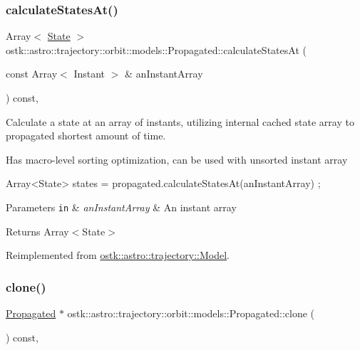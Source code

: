 \subsubsection{\texorpdfstring{calculate\+States\+At()}{calculateStatesAt()}}
{\footnotesize\ttfamily Array$<$ \hyperlink{classostk_1_1astro_1_1trajectory_1_1_state}{State} $>$ ostk\+::astro\+::trajectory\+::orbit\+::models\+::\+Propagated\+::calculate\+States\+At (\begin{DoxyParamCaption}\item[{const Array$<$ Instant $>$ \&}]{an\+Instant\+Array }\end{DoxyParamCaption}) const\hspace{0.3cm}{\ttfamily [override]}, {\ttfamily [virtual]}}



Calculate a state at an array of instants, utilizing internal cached state array to propagated shortest amount of time. 

Has macro-\/level sorting optimization, can be used with unsorted instant array 
\begin{DoxyCode}
Array<State> states = propagated.calculateStatesAt(anInstantArray) ;
\end{DoxyCode}
 
\begin{DoxyParams}[1]{Parameters}
\mbox{\tt in}  & {\em an\+Instant\+Array} & An instant array \\
\hline
\end{DoxyParams}
\begin{DoxyReturn}{Returns}
Array$<$\+State$>$ 
\end{DoxyReturn}


Reimplemented from \hyperlink{classostk_1_1astro_1_1trajectory_1_1_model_a3c3e4913aed2272174c0e6cd0d1a6415}{ostk\+::astro\+::trajectory\+::\+Model}.

\mbox{\label{classostk_1_1astro_1_1trajectory_1_1orbit_1_1models_1_1_propagated_a283639d985495c05adb9e80edb91cd12}} 
\subsubsection{\texorpdfstring{clone()}{clone()}}
{\footnotesize\ttfamily \hyperlink{classostk_1_1astro_1_1trajectory_1_1orbit_1_1models_1_1_propagated}{Propagated} $\ast$ ostk\+::astro\+::trajectory\+::orbit\+::models\+::\+Propagated\+::clone (\begin{DoxyParamCaption}{ }\end{DoxyParamCaption}) const\hspace{0.3cm}{\ttfamily [override]}, {\ttfamily [virtual]}}



